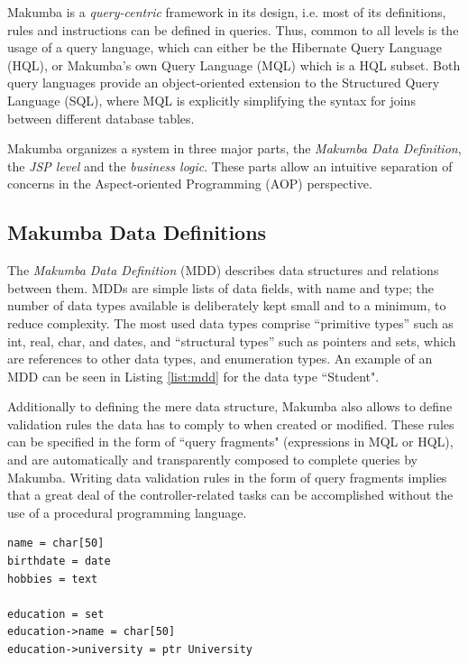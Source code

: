 \documentclass{llncs}
\begin{document}
Makumba is a \textit{query-centric} framework in its design, i.e. most of its definitions, rules and instructions can be defined in queries. Thus, common to all levels is the usage of a query language, which can either be the Hibernate Query Language (HQL), or Makumba's own Query Language (MQL) which is a HQL subset. Both query languages provide an object-oriented extension to the Structured Query Language (SQL), where MQL is explicitly simplifying the syntax for joins between different database tables.

Makumba organizes a system in three major parts, the \textit{Makumba Data Definition}, the \textit{JSP level} and the \textit{business logic}. These parts allow an intuitive separation of concerns in the Aspect-oriented Programming (AOP) \cite{Kiczales97aspect-orientedprogramming} perspective.

\subsection{Makumba Data Definitions}
The \textit{Makumba Data Definition} (MDD) describes data structures and relations between them. MDDs are simple lists of data fields, with name and type; the number of data types available is deliberately kept small and to a minimum, to reduce complexity. The most used data types comprise ``primitive types'' such as int, real, char, and dates, and ``structural types'' such as pointers and sets, which are references to other data types, and enumeration types. An example of an MDD can be seen in Listing \ref{list:mdd} for the data type ``Student".

Additionally to defining the mere data structure, Makumba also allows to define validation rules the data has to comply to when created or modified. These rules can be specified in the form of ``query fragments" (expressions in MQL or HQL), and are automatically and transparently composed to complete queries by Makumba. Writing data validation rules in the form of query fragments implies that a great deal of the controller-related tasks can be accomplished without the use of a procedural programming language.

\lstset{basicstyle=\small, captionpos=b, caption=Makumba Data Definition "Student", label=list:mdd, frame=shadowbox}
\begin{lstlisting}
name = char[50]
birthdate = date
hobbies = text

education = set
education->name = char[50]
education->university = ptr University
\end{lstlisting}
\end{document}
